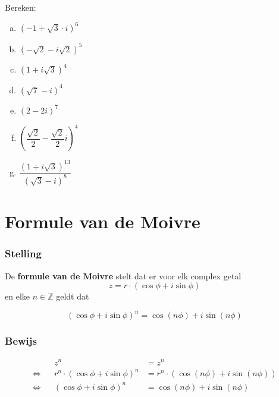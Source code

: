 \documentclass[12pt,twoside,a4paper]{article}
\begin{document}
\begin{oefening}
Bereken:
\begin{multicols}{2}
\begin{enumerate}[(a)]
  \itemsep.5em
  \item $\displaystyle \left(-1+\sqrt{3} \cdot i\right)^6$
  \item $\displaystyle \left(-\sqrt{2}-i\sqrt{2}\right)^5$
  \item $\displaystyle \left(1+i\sqrt{3}\right)^4$
  \item $\displaystyle \left(\sqrt{7}-i\right)^4$
  \item $\displaystyle \left(2-2i\right)^7$
  \item $\displaystyle \left(\dfrac{\sqrt{2}}{2}-\dfrac{\sqrt{2}}{2}i\right)^4$
  \item $\displaystyle \dfrac{\left(1+i\sqrt{3}\right)^{13}}{\left(\sqrt{3}-i\right)^8}$
\end{enumerate}
\end{multicols}
\end{oefening}

\cleardoublepage
\section{Formule van de Moivre}

\subsubsection*{Stelling}
De {\bf formule van de Moivre} stelt dat er voor elk complex getal
\[z=r \cdot (\cos \phi + i\sin \phi)\]
en elke $n\in\mathbb{Z}$ geldt dat
\begin{mdframed}
  \[ \left( \cos \phi + i\sin \phi \right)^n = \cos( n\phi ) + i\sin( n\phi ) \]
\end{mdframed}

\subsubsection*{Bewijs}
\begin{align*}
     &&                        z^n &= z^n\\
  \Leftrightarrow && r^n \cdot (\cos \phi + i \sin \phi)^n &= r^n \cdot (\cos( n\phi ) + i\sin( n\phi ))\\
  \Leftrightarrow && (\cos \phi + i \sin \phi)^n &= \cos( n\phi ) + i\sin( n\phi )\\
\end{align*}
\end{document}
